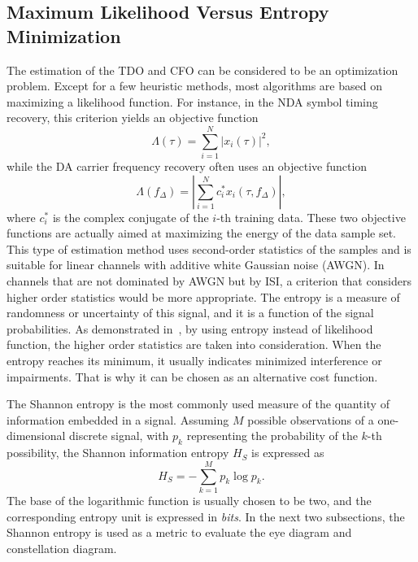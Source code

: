 \documentclass[12pt, draftclsnofoot, onecolumn]{IEEEtran}
\begin{document}
\subsection{Maximum Likelihood Versus Entropy Minimization}
\label{sec:versus}
The estimation of the TDO and CFO can be considered to be an optimization problem.
Except for a few heuristic methods, most algorithms are based on maximizing a likelihood function.
For instance, in the NDA symbol timing recovery, this criterion yields an objective function~\cite{mengali1997synchronization}
\begin{equation}
\Lambda(\tau) =\sum\limits_{i = 1}^N {{{\left| {{x_i}( \tau )} \right|}^2}}, 
\end{equation}
while the DA carrier frequency recovery often uses an objective function~\cite{mengali1997synchronization} 
\begin{equation}
\Lambda ({f_\Delta })=\left| \sum\limits_{i = 1}^N {{{{c_i^*{x_i}(\tau ,{f_\Delta })}}}} \right|, 
\end{equation}
where \(c_i^*\) is the complex conjugate of the \(i\)-th training data.
These two objective functions are actually aimed at maximizing the energy of the data sample set.
This type of estimation method uses second-order statistics of the samples and is suitable for linear channels with additive white Gaussian noise (AWGN).
In channels that are not dominated by AWGN but by ISI, a criterion that considers higher order statistics would be more appropriate.
The entropy is a measure of randomness or uncertainty of this signal, and it is a function of the signal probabilities.
As demonstrated in~\cite{Santamaria2002}, by using entropy instead of likelihood function, the higher order statistics are taken into consideration.
When the entropy reaches its minimum, it usually indicates minimized interference or impairments.
That is why it can be chosen as an alternative cost function.

The Shannon entropy is the most commonly used measure of the quantity of information  embedded in a signal.
Assuming \(M\) possible observations of a one-dimensional discrete signal, with \(p_k\) representing the probability of the \(k\)-th possibility, the Shannon information entropy \(H_S\) is expressed as~\cite{Shannon1948}
\begin{equation}
H_S =  - \sum\limits_{k = 1}^M {{p_k}\log {p_k}}.
\label{eq:entropy}
\end{equation}
The base of the logarithmic function is usually chosen to be two, and the corresponding entropy unit is expressed in \textit{bits}.
In the next two subsections, the Shannon entropy is used as a metric to evaluate the eye diagram and constellation diagram.
\end{document}
